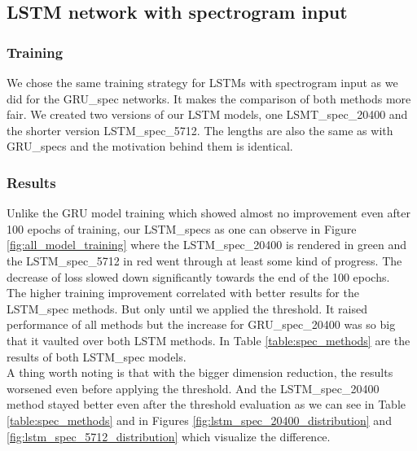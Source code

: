 \subsection{LSTM network with spectrogram input}

\subsubsection{Training}
We chose the same training strategy for LSTMs with spectrogram input as we did for the GRU\_spec networks. It makes the comparison of both methods more fair. We created two versions of our LSTM models, one LSMT\_spec\_20400 and the shorter version LSTM\_spec\_5712. The lengths are also the same as with GRU\_specs and the motivation behind them is identical.

\subsubsection{Results}
Unlike the GRU model training which showed almost no improvement even after 100 epochs of training, our LSTM\_specs as one can observe in Figure \ref{fig:all_model_training} where the LSTM\_spec\_20400 is rendered in green and the LSTM\_spec\_5712 in red went through at least some kind of progress. The decrease of loss slowed down significantly towards the end of the 100 epochs. \\
The higher training improvement correlated with better results for the LSTM\_spec methods. But only until we applied the threshold. It raised performance of all methods but the increase for GRU\_spec\_20400 was so big that it vaulted over both LSTM methods. In Table \ref{table:spec_methods} are the results of both LSTM\_spec models. \\
A thing worth noting is that with the bigger dimension reduction, the results worsened even before applying the threshold. And the LSTM\_spec\_20400 method stayed better even after the threshold evaluation as we can see in Table \ref{table:spec_methods} and in Figures \ref{fig:lstm_spec_20400_distribution} and \ref{fig:lstm_spec_5712_distribution} which visualize the difference.


